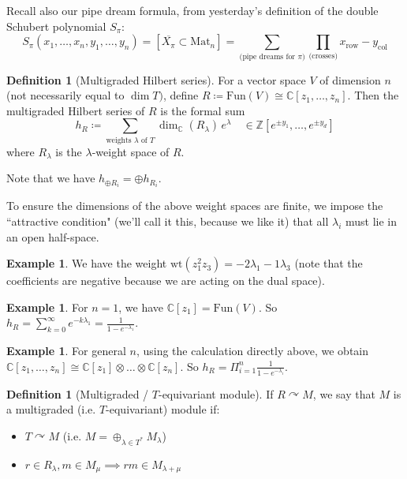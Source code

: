 \documentclass[12pt]{amsart}
\numberwithin{equation}{section}
\theoremstyle{definition}
\newtheorem{Example}[equation]{Example}
\newtheorem{Definition}[equation]{Definition}
\numberwithin{figure}{section}
\newcommand{\C}{\mathbb{C}}
\begin{document}
Recall also our pipe dream formula, from yesterday's definition of the double Schubert polynomial $S_{\pi}$:
$$S_{\pi}(x_1, \dots, x_n, y_1, \dots, y_n) = [\overline{X_{\pi}} \subset \text{Mat}_n] = \sum_{\text{(pipe dreams for } \pi)} \prod_{\text{(crosses)}}x_{\text{row}} - y_{\text{col}}$$

\vspace{1em}

\begin{Definition}[Multigraded Hilbert series]
For a vector space $V$ of dimension $n$ (not necessarily equal to $\dim T)$, define $R \coloneqq \text{Fun}(V) \cong \C[z_1, \dots, z_n]$. Then the multigraded Hilbert series of $R$ is the formal sum
$$ h_R \coloneqq \sum_{\text{weights } \lambda \text{ of } T} \dim_{\C}(R_{\lambda})\, e^{\lambda}  \quad \in \mathbb{Z}[e^{\pm y_1}, \dots, e^{\pm y_d}]$$
where $R_{\lambda}$ is the $\lambda$-weight space of $R$.
\end{Definition}

Note that we have $h_{\oplus R_i} = \oplus h_{R_i}$.

To ensure the dimensions of the above weight spaces are finite, we impose the ``attractive condition" (we'll call it this, because we like it) that all $\lambda_i$ must lie in an open half-space.

\begin{Example}
We have the weight $\text{wt}(z_1^2 z_3) = -2 \lambda_1 - 1 \lambda_3$ (note that the coefficients are negative because we are acting on the dual space).
\end{Example}

\begin{Example}
For $n=1$, we have $\C[z_1] = \text{Fun}(V)$. So $h_R = \sum_{k=0}^{\infty} e^{-k \lambda_1} = \frac{1}{1-e^{-\lambda_1}}$.
\end{Example}

\begin{Example}
For general $n$, using the calculation directly above, we obtain $\C[z_1, \dots, z_n] \cong \C[z_1] \otimes \dots \otimes \C[z_n]$. So $h_R = \Pi_{i=1}^{n}  \frac{1}{1-e^{-\lambda_i}}$.
\end{Example}

\begin{Definition}[Multigraded / $T$-equivariant module]
If $R \curvearrowright M$, we say that $M$ is a multigraded (i.e. $T$-equivariant) module if:
\begin{itemize}
    \item $T \curvearrowright M$ (i.e. $M = \oplus_{\lambda \in T^{\ast}} M_{\lambda}$)
    \item $r \in R_{\lambda}, m \in M_{\mu} \implies rm \in M_{\lambda + \mu}$
\end{itemize} \end{Definition}
\end{document}
